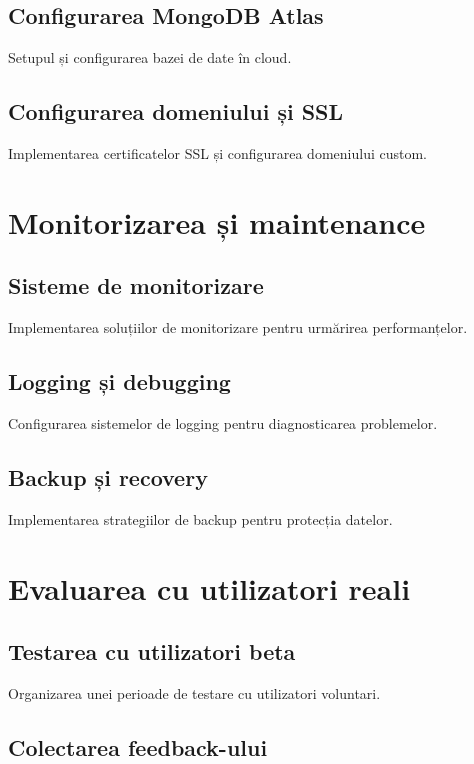 \documentclass[12pt,a4paper]{report}
\begin{document}
\subsection{Configurarea MongoDB Atlas}

Setupul și configurarea bazei de date în cloud.

\subsection{Configurarea domeniului și SSL}

Implementarea certificatelor SSL și configurarea domeniului custom.

\section{Monitorizarea și maintenance}

\subsection{Sisteme de monitorizare}

Implementarea soluțiilor de monitorizare pentru urmărirea performanțelor.

\subsection{Logging și debugging}

Configurarea sistemelor de logging pentru diagnosticarea problemelor.

\subsection{Backup și recovery}

Implementarea strategiilor de backup pentru protecția datelor.

\section{Evaluarea cu utilizatori reali}

\subsection{Testarea cu utilizatori beta}

Organizarea unei perioade de testare cu utilizatori voluntari.

\subsection{Colectarea feedback-ului}
\end{document}

